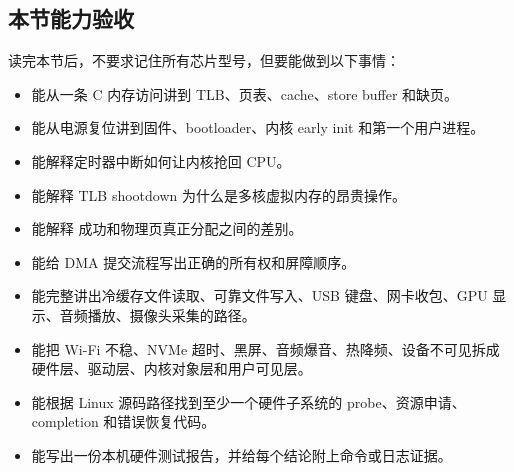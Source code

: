 \subsection{本节能力验收}

读完本节后，不要求记住所有芯片型号，但要能做到以下事情：

\begin{rubricbox}
\begin{itemize}
\tightlist
\item 能从一条 C 内存访问讲到 TLB、页表、cache、store buffer 和缺页。
\item 能从电源复位讲到固件、bootloader、内核 early init 和第一个用户进程。
\item 能解释定时器中断如何让内核抢回 CPU。
\item 能解释 TLB shootdown 为什么是多核虚拟内存的昂贵操作。
\item 能解释  成功和物理页真正分配之间的差别。
\item 能给 DMA 提交流程写出正确的所有权和屏障顺序。
\item 能完整讲出冷缓存文件读取、可靠文件写入、USB 键盘、网卡收包、GPU 显示、音频播放、摄像头采集的路径。
\item 能把 Wi-Fi 不稳、NVMe 超时、黑屏、音频爆音、热降频、设备不可见拆成硬件层、驱动层、内核对象层和用户可见层。
\item 能根据 Linux 源码路径找到至少一个硬件子系统的 probe、资源申请、completion 和错误恢复代码。
\item 能写出一份本机硬件测试报告，并给每个结论附上命令或日志证据。
\end{itemize}
\end{rubricbox}
